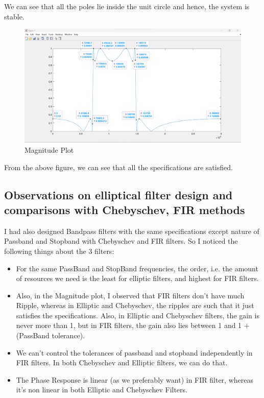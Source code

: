 \documentclass{article}
\begin{document}
We can see that all the poles lie inside the unit circle and hence, the system is stable.

\begin{figure}[h!]

\centering
\includegraphics[scale = 0.4]{Elliptic_freq_BandPass.png}
\caption{Magnitude Plot}
\end{figure}

From the above figure, we can see that all the specifications are satisfied.

\subsection{Observations on elliptical filter design and comparisons with Chebyschev, FIR methods}

I had also designed Bandpass filters with the same specifications except nature of Passband and Stopband with Chebyschev and FIR filters. So I noticed the following things about the 3 filters:

\begin{itemize}
    \item For the same PassBand and StopBand frequencies, the order, i.e. the amount of resources we need is the least for elliptic filters, and highest for FIR filters.
    \item Also, in the Magnitude plot, I observed that FIR filters don't have much Ripple, whereas in Elliptic and Chebyschev, the ripples are such that it just satisfies the specifications. Also, in Elliptic and Chebyschev filters, the gain is never more than 1, but in FIR filters, the gain also lies between 1 and 1 + (PassBand tolerance).
    \item We can’t control the tolerances of passband and stopband independently in FIR filters. In both Chebyschev and Elliptic filters, we can do that.
    \item The Phase Response is linear (as we preferably want) in FIR filter, whereas it's non linear in both Elliptic and Chebyschev Filters.
\end{itemize}
\end{document}
